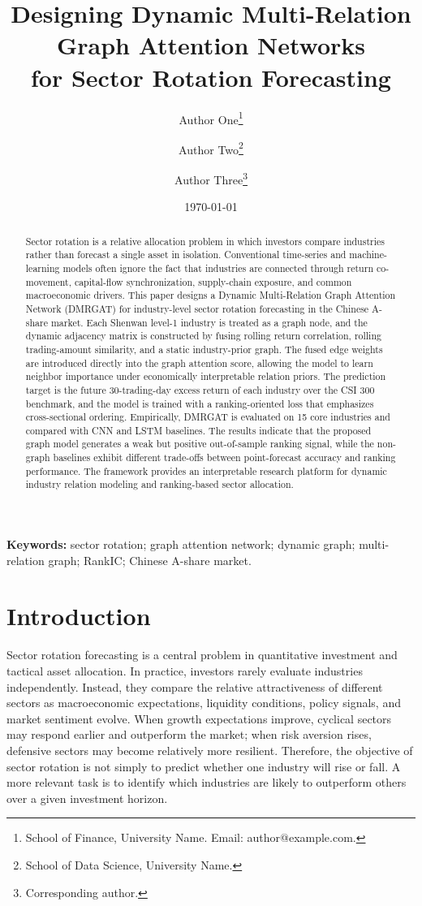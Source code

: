 \documentclass[12pt]{article}
\title{\bf Designing Dynamic Multi-Relation Graph Attention Networks\\
for Sector Rotation Forecasting}
\author{
Author One\thanks{School of Finance, University Name. Email: author@example.com.}
\and
Author Two\thanks{School of Data Science, University Name.}
\and
Author Three\thanks{Corresponding author.}
}
\date{\today}
\begin{document}
\maketitle

\begin{abstract}
Sector rotation is a relative allocation problem in which investors compare industries rather than forecast a single asset in isolation. Conventional time-series and machine-learning models often ignore the fact that industries are connected through return co-movement, capital-flow synchronization, supply-chain exposure, and common macroeconomic drivers. This paper designs a Dynamic Multi-Relation Graph Attention Network (DMRGAT) for industry-level sector rotation forecasting in the Chinese A-share market. Each Shenwan level-1 industry is treated as a graph node, and the dynamic adjacency matrix is constructed by fusing rolling return correlation, rolling trading-amount similarity, and a static industry-prior graph. The fused edge weights are introduced directly into the graph attention score, allowing the model to learn neighbor importance under economically interpretable relation priors. The prediction target is the future 30-trading-day excess return of each industry over the CSI 300 benchmark, and the model is trained with a ranking-oriented loss that emphasizes cross-sectional ordering. Empirically, DMRGAT is evaluated on 15 core industries and compared with CNN and LSTM baselines. The results indicate that the proposed graph model generates a weak but positive out-of-sample ranking signal, while the non-graph baselines exhibit different trade-offs between point-forecast accuracy and ranking performance. The framework provides an interpretable research platform for dynamic industry relation modeling and ranking-based sector allocation.
\end{abstract}

\noindent \textbf{Keywords:} sector rotation; graph attention network; dynamic graph; multi-relation graph; RankIC; Chinese A-share market.

\section{Introduction}

Sector rotation forecasting is a central problem in quantitative investment and tactical asset allocation. In practice, investors rarely evaluate industries independently. Instead, they compare the relative attractiveness of different sectors as macroeconomic expectations, liquidity conditions, policy signals, and market sentiment evolve. When growth expectations improve, cyclical sectors may respond earlier and outperform the market; when risk aversion rises, defensive sectors may become relatively more resilient. Therefore, the objective of sector rotation is not simply to predict whether one industry will rise or fall. A more relevant task is to identify which industries are likely to outperform others over a given investment horizon.
\end{document}
